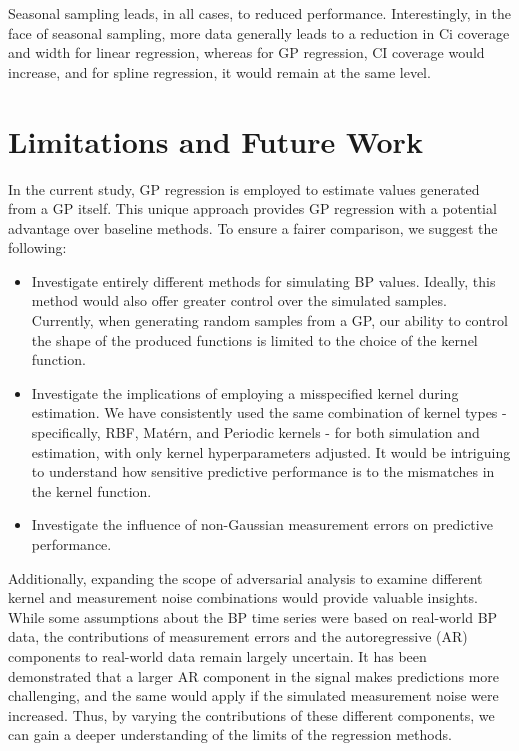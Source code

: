 Seasonal sampling leads, in all cases, to reduced performance.
Interestingly, in the face of seasonal sampling, more data generally leads to
a reduction in Ci coverage and width for linear regression,
whereas for GP regression, CI coverage would increase,
and for spline regression, it would remain at the same level.


\section{Limitations and Future Work}

In the current study, GP regression is employed to estimate values generated from a GP itself.
This unique approach provides GP regression with a potential advantage over baseline methods.
To ensure a fairer comparison, we suggest the following:

\begin{itemize}
    \item Investigate entirely different methods for simulating BP values.
    Ideally, this method would also offer greater control over the simulated samples.
    Currently, when generating random samples from a GP, our ability to control the shape of the produced
    functions is limited to the choice of the kernel function.

    \item Investigate the implications of employing a misspecified kernel during estimation.
    We have consistently used the same combination of kernel types - specifically, RBF, Matérn, and Periodic kernels -
    for both simulation and estimation, with only kernel hyperparameters adjusted.
    It would be intriguing to understand how sensitive predictive performance is to the mismatches in
    the kernel function.

    \item Investigate the influence
    of non-Gaussian measurement errors on predictive performance.
\end{itemize}

Additionally, expanding the scope of adversarial analysis to examine different
kernel and measurement noise combinations would provide valuable insights.
While some assumptions about the BP time series were based on real-world BP data,
the contributions of measurement errors and the autoregressive (AR) components
to real-world data remain largely uncertain.
It has been demonstrated that a larger AR component in the signal makes predictions
more challenging, and the same would apply if the simulated measurement noise were increased.
Thus, by varying the contributions of these different components,
we can gain a deeper understanding of the limits of the regression methods.

